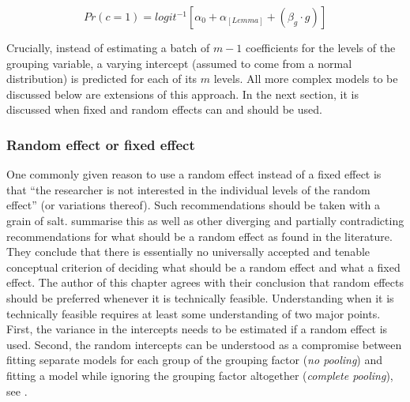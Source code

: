 \begin{equation}
  Pr(c=1)=logit^{-1}\left[\alpha_0+\alpha_{[Lemma]}+(\beta_{g}\cdot g)\right]
  \label{eq:002a}
\end{equation}

Crucially, instead of estimating a batch of $m-1$ coefficients for the levels of the grouping variable, a varying intercept (assumed to come from a normal distribution) is predicted for each of its $m$ levels.
All more complex models to be discussed below are extensions of this approach.
In the next section, it is discussed when fixed and random effects can and should be used.

\subsubsection{Random effect or fixed effect}
\label{sec:choosingbetweenrandomandfixedeffects}

One commonly given reason to use a random effect instead of a fixed effect is that ``the researcher is not interested in the individual levels of the random effect'' (or variations thereof).
Such recommendations should be taken with a grain of salt.
\citet[245--247]{GelmanHill2006} summarise this as well as other diverging and partially contradicting recommendations for what should be a random effect as found in the literature.
They conclude that there is essentially no universally accepted and tenable conceptual criterion of deciding what should be a random effect and what a fixed effect.
The author of this chapter agrees with their conclusion that random effects should be preferred whenever it is technically feasible.
Understanding when it is technically feasible requires at least some understanding of two major points.
First, the variance in the intercepts needs to be estimated if a random effect is used.
Second, the random intercepts can be understood as a compromise between fitting separate models for each group of the grouping factor (\textit{no pooling}) and fitting a model while ignoring the grouping factor altogether (\textit{complete pooling}), see \citet[Ch.~12]{GelmanHill2006}.

